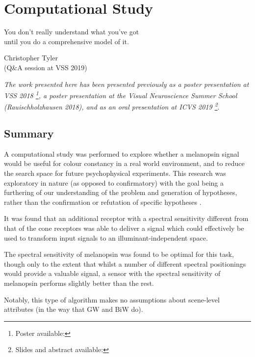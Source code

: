 \chapter{Computational Study}
\label{chap:Melcomp}

\begin{itquote}{}
You don't really understand what you've got \\
until you do a comprehensive model of it.
\end{itquote}

\begin{flushright}
Christopher Tyler \\ 
(Q\&A session at VSS 2019)
\end{flushright}

\textit{The work presented here has been presented previously as a poster presentation at VSS 2018 \citep{garside_does_2018}\footnote{Poster available: }, a poster presentation at the Visual Neuroscience Summer School (Rauischholzhausen 2018), and as an oral presentation at ICVS 2019 \footnote{Slides and abstract available: }}.

\section{Summary}

A computational study was performed to explore whether a melanopsin signal would be useful for colour constancy in a real world environment, and to reduce the search space for future psychophysical experiments. This research was exploratory in nature (as opposed to confirmatory) with the goal being a furthering of our understanding of the problem and generation of hypotheses, rather than the confirmation or refutation of specific hypotheses \citep{steinle_entering_1997}.

It was found that an additional receptor with a spectral sensitivity different from that of the cone receptors was able to deliver a signal which could effectively be used to transform input signals to an illuminant-independent space. 

The spectral sensitivity of melanopsin was found to be optimal for this task, though only to the extent that whilst a number of different spectral positionings would provide a valuable signal, a sensor with the spectral sensitivity of melanopsin performs slightly better than the rest.

Notably, this type of algorithm makes no assumptions about scene-level attributes (in the way that \acrlong{GW} and \acrlong{BiW} do).

